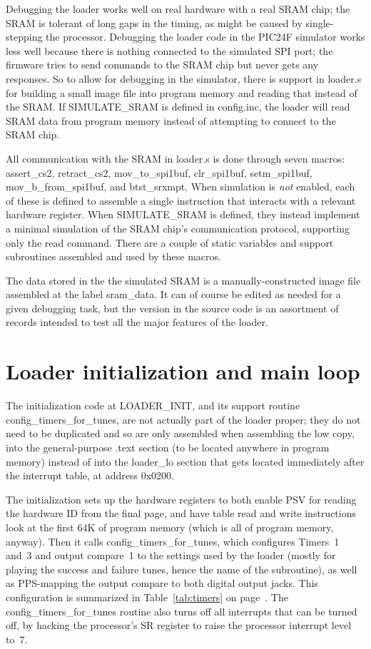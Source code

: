 Debugging the loader works well on real hardware with a real SRAM chip; the
SRAM is tolerant of long gaps in the timing, as might be caused by
single-stepping the processor.  Debugging the loader code in the PIC24F
simulator works less well because there is nothing connected to the
simulated SPI port; the firmware tries to send commands to the SRAM chip but
never gets any responses.  So to allow for debugging in the simulator, there
is support in loader.s for building a small image file into program memory
and reading that instead of the SRAM.  If SIMULATE\_SRAM is defined in
config.inc, the loader will read SRAM data from program memory instead of
attempting to connect to the SRAM chip.

All communication with the SRAM in loader.s is done through seven macros:
assert\_cs2, retract\_cs2, mov\_to\_spi1buf, clr\_spi1buf, setm\_spi1buf,
mov\_b\_from\_spi1buf, and btst\_srxmpt.  When simulation is \emph{not}
enabled, each of these is defined to assemble a single instruction that
interacts with a relevant hardware register.  When SIMULATE\_SRAM is
defined, they instead implement a minimal simulation of the SRAM chip's
communication protocol, supporting only the read command.  There are a
couple of static variables and support subroutines assembled and used by
these macros.

The data stored in the the simulated SRAM is a manually-constructed image
file assembled at the label sram\_data.  It can of course be edited as
needed for a given debugging task, but the version in the source code is an
assortment of records intended to test all the major features of the loader.

\section{Loader initialization and main loop}

The initialization code at LOADER\_INIT, and its support routine
config\_timers\_for\_tunes, are not actually part of the loader proper; they
do not need to be duplicated and so are only assembled when assembling the
low copy, into the general-purpose .text section (to be located anywhere in
program memory) instead of into the loader\_lo section that gets located
immediately after the interrupt table, at address 0x0200.

The initialization sets up the hardware registers to both enable PSV for
reading the hardware ID from the final page, and have table read and write
instructions look at the first 64K of program memory (which is all of
program memory, anyway).  Then it calls config\_timers\_for\_tunes, which
configures Timers~1 and~3 and output compare~1 to the settings used by the
loader (mostly for playing the success and failure tunes, hence the name of
the subroutine), as well as PPS-mapping the output compare to both digital
output jacks.  This configuration is summarized in Table~\ref{tab:timers} on
page~\pageref{tab:timers}.  The config\_timers\_for\_tunes routine also
turns off all interrupts that can be turned off, by hacking the processor's
SR register to raise the processor interrupt level to~7.

